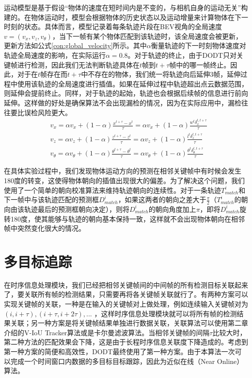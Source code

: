 运动模型是基于假设“物体的速度在短时间内是不变的，与相机自身的运动无关”构建的。在物体运动时，模型会根据物体的历史状态以及运动增量来计算物体在下一时刻的状态。具体而言，模型记录着每条轨迹片段在BEV视角的全局速度$v = (v_x, v_z, v_{\theta})$，当下一帧有某个物体匹配到该轨迹时，该全局速度会被更新，更新方法如公式\ref{con:global_velocity}所示。其中$\alpha$衡量轨迹的下一时刻物体速度对轨迹全局速度的影响，在实际运行$\alpha = 0.8$。对于轨迹的终止，由于DODT只对关键帧进行检测，因此我们无法判断轨迹具体在$t$帧到$t+\tau$帧中的哪一帧终止。因此，对于在$t$帧存在而$t+\tau$中不存在的物体，我们统一将轨迹向后延伸3帧，延伸过程中使用该轨迹的全局速度进行插值。如果在延伸过程中轨迹超出点云数据范围，则延伸会提前终止。同样，对于轨迹的起始，轨迹也会根据后续帧的信息进行前向延伸。这样做的好处是确保算法不会出现漏检的情况，因为在实际应用中，漏检往往要比误检风险更大。
\begin{equation}
\begin{aligned}
	& v_x = \alpha v_x + (1-\alpha)\frac{x^{t+\tau} - x^{t}}{\tau} = \alpha v_x + (1-\alpha)\frac{w^t \delta_x^{t,t+\tau}}{\tau}\\
	& v_z = \alpha v_z + (1-\alpha)\frac{z^{t+\tau} - z^{t}}{\tau} = \alpha v_z + (1-\alpha)\frac{l^t \delta_z^{t,t+\tau}}{\tau}\\
	& v_{\theta} = \alpha v_{\theta} + (1-\alpha)\frac{\theta^{t+\tau} - \theta^{t}}{\tau} = \alpha v_{\theta} + (1-\alpha)\frac{\theta^t \delta_{\theta}^{t,t+\tau}}{\tau}
\end{aligned}
\label{con:global_velocity}
\end{equation}

在具体实验过程中，我们发现物体运动方向的预测在相邻关键帧中有时候会发生180度的转变，这使得物体朝向的插值出现很大的偏差。为了解决这个问题，我们使用了一个简单的朝向校准算法来维持轨迹朝向的连续性。对于一条轨迹$T^i_{match}$和下一帧中与该轨迹匹配的预测框$D^i_{match}$，如果这两者的朝向之差大于$\frac{\pi}{2}$（$T^i_{match}$的朝向由该轨迹最后的预测框朝向决定），则将$D^i_{match}$的朝向角度加上$\pi$，即将$D^i_{match}$旋转180度，使其能够与轨迹的朝向基本保持一致，这样就不会出现物体朝向在相邻帧中突然变化很大的情况。

\section{多目标追踪}
\label{tracking_module}
在时序信息处理模块，我们已经把相邻关键帧间的中间帧的所有检测目标关联起来了，要关联所有帧的检测结果，只需要再将各关键帧关联就行了。有两种方案可以实现关键帧的关联，一种是在输入的关键帧对上做处理，例如连续输入关键帧对为$(i, i+\tau), (i+\tau, i+2\tau), ...$ ，这样时序信息处理模块就可以将所有帧的检测结果关联；另一种方案是将关键帧结果单独进行数据关联，关联算法可以使用第二章介绍的V-IoU Tracker算法或是卡尔曼滤波算法。当相邻关键帧的间隔$\tau$比较大时，第二种方法的匹配效果会下降，这是由于长程时序信息关联度下降造成的。考虑到第一种方案的简便和高效性，DODT最终使用了第一种方案。由于本算法一次可以完成一个时间窗口内数据的多目标目标跟踪，因此为近似在线（Near Online）算法。


